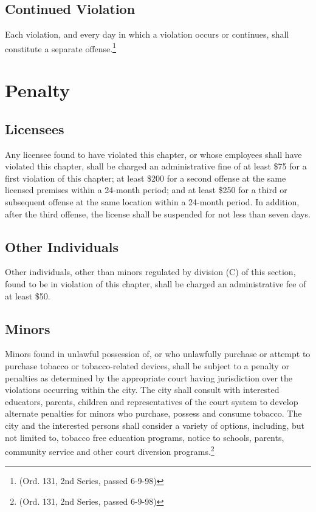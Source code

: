 \subsection{Continued Violation}
Each violation, and every day in which a violation occurs or continues, shall constitute a separate offense.\footnote{(Ord. 131, 2nd Series, passed 6-9-98)}

\setcounter{section}{98}
\section{Penalty}
\subsection{Licensees}
Any licensee found to have violated this chapter, or whose employees shall have violated this chapter, shall be charged an administrative fine of at least \$75 for a first violation of this chapter; at least \$200 for a second offense at the same licensed premises within a 24-month period; and at least \$250 for a third or subsequent offense at the same location within a 24-month period.  In addition, after the third offense, the license shall be suspended for not less than seven days.
\subsection{Other Individuals}
Other individuals, other than minors regulated by division (C) of this section, found to be in violation of this chapter, shall be charged an administrative fee of at least \$50.
\subsection{Minors}
Minors found in unlawful possession of, or who unlawfully purchase or attempt to purchase tobacco or tobacco-related devices, shall be subject to a penalty or penalties as determined by the appropriate court having jurisdiction over the violations occurring within the city.  The city shall consult with interested educators, parents, children and representatives of the court system to develop alternate penalties for minors who purchase, possess and consume tobacco.  The city and the interested persons shall consider a variety of options, including, but not limited to, tobacco free education programs, notice to schools, parents, community service and other court diversion programs.\footnote{(Ord. 131, 2nd Series, passed 6-9-98)}
